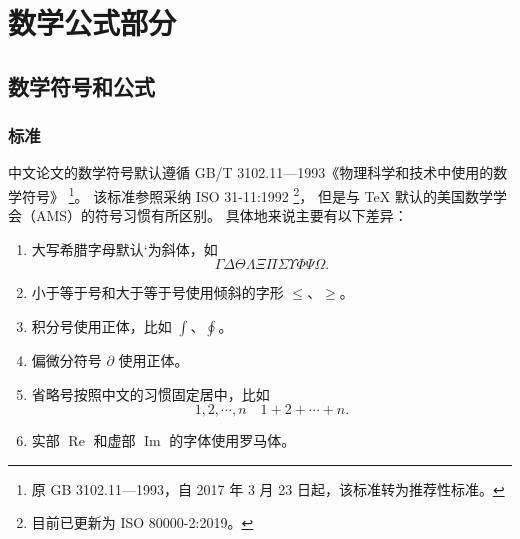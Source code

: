 \setlength{\baselineskip}{20pt}

\section{数学公式部分}
\subsection{数学符号和公式}
\subsubsection{标准}
中文论文的数学符号默认遵循 GB/T 3102.11—1993《物理科学和技术中使用的数学符号》
\footnote{原 GB 3102.11—1993，自 2017 年 3 月 23 日起，该标准转为推荐性标准。}。
该标准参照采纳 ISO 31-11:1992 \footnote{目前已更新为 ISO 80000-2:2019。}，
但是与 \TeX{} 默认的美国数学学会（AMS）的符号习惯有所区别。
具体地来说主要有以下差异：
\begin{enumerate}
	\item 
	大写希腊字母默认`为斜体，如
	\begin{equation*}
		\varGamma \varDelta \varTheta \varLambda \varXi \varPi \varSigma \varUpsilon \varPhi \varPsi \varOmega.
	\end{equation*}
	\item 小于等于号和大于等于号使用倾斜的字形 $\le$、$\ge$。
	\item 积分号使用正体，比如 $\int$、$\oint$。
	\item
	偏微分符号 $\partial$ 使用正体。
	\item
	省略号按照中文的习惯固定居中，比如
	\begin{equation*}
		1, 2, \cdots, n \quad 1 + 2 + \cdots + n.
	\end{equation*}
	\item
	实部 $\operatorname{Re}$ 和虚部 $\operatorname{Im}$ 的字体使用罗马体。
\end{enumerate}




